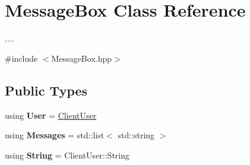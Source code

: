 \hypertarget{classMessageBox}{}\section{Message\+Box Class Reference}
\label{classMessageBox}


....  




{\ttfamily \#include $<$Message\+Box.\+hpp$>$}

\subsection*{Public Types}
\begin{DoxyCompactItemize}
\item 
using {\bfseries User} = \hyperlink{classClientUser}{Client\+User}\hypertarget{classMessageBox_a6bd0e56c37402c0430787b7df6ce1bef}{}\label{classMessageBox_a6bd0e56c37402c0430787b7df6ce1bef}

\item 
using {\bfseries Messages} = std\+::list$<$ std\+::string $>$\hypertarget{classMessageBox_a535c4f4c90660086463ee973bf29d299}{}\label{classMessageBox_a535c4f4c90660086463ee973bf29d299}

\item 
using {\bfseries String} = Client\+User\+::\+String\hypertarget{classMessageBox_ac36eb11a497aed219987027968723150}{}\label{classMessageBox_ac36eb11a497aed219987027968723150}

\end{DoxyCompactItemize}
